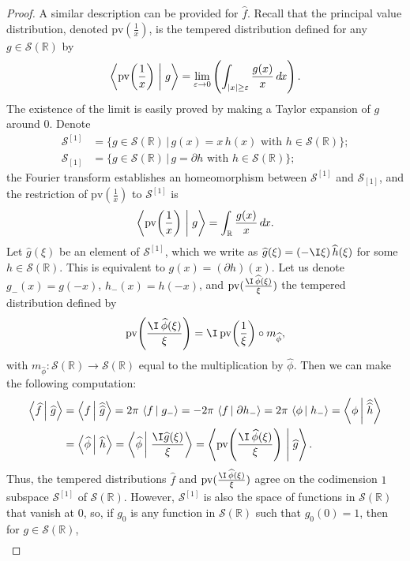 \documentclass[envcountsame]{svmult}
\newcommand{\R}{\mathbb{R}}
\newcommand{\schwartz}{\mathscr{S}}
\newcommand{\eps}{\varepsilon}
\newcommand{\scal}[2]{\left\langle #1\vphantom{#2}\,\right |\left.#2 \vphantom{#1}\right\rangle}
\newcommand{\DD}[1]{\,d\hspace*{-0.3mm}{#1}}
\begin{document}
\begin{proof}
A similar description can be provided for $\widehat{f}$. Recall that the principal value distribution, denoted $\mathrm{pv}(\frac{1}{x})$, is the tempered distribution defined for any $g \in \schwartz(\R)$ by
$$\scal{\mathrm{pv}\!\left(\frac{1}{x}\right)}{g} = \lim_{\eps \to 0} \left(\int_{|x|\geq \eps} \frac{g(x)}{x}\DD{x}\right).$$
The existence of the limit is easily proved by making a Taylor expansion of $g$ around $0$. 
Denote 
\begin{align*}
\schwartz^{[1]} &= \{g \in \schwartz(\R)\,|\,g(x) = x\,h(x) \text{ with }h \in \schwartz(\R)\} ;\\
\schwartz_{[1]} &= \{g \in \schwartz(\R)\,|\,g = \partial h \text{ with }h \in \schwartz(\R)\} ;
\end{align*}
the Fourier transform establishes an homeomorphism between $\schwartz^{[1]}$ and $\schwartz_{[1]}$, and the restriction of $\mathrm{pv}(\frac{1}{x})$ to $\schwartz^{[1]}$ is
$$\scal{\mathrm{pv}\!\left(\frac{1}{x}\right)}{g} = \int_{\R} \frac{g(x)}{x}\DD{x}.$$
Let $\widehat{g}(\xi)$ be an element of $\schwartz^{[1]}$, which we write as $\widehat{g}(\xi) = (-\I\xi)\,\widehat{h}(\xi)$ for some $h \in \schwartz(\R)$. This is equivalent to $g(x) = (\partial h)(x)$.
Let us denote $g_-(x) = g(-x)$, $h_-(x) = h(-x)$,
and $\mathrm{pv}(\frac{\I\,\widehat{\phi}(\xi)}{\xi})$ the tempered distribution defined by 
$$\mathrm{pv}\!\left(\frac{\I\,\widehat{\phi}(\xi)}{\xi}\right) = \I\, \mathrm{pv}\!\left(\frac{1}{\xi}\right)\circ m_{\widehat{\phi}},$$
with $m_{\widehat{\phi}}:\schwartz(\R) \to \schwartz(\R)$ equal to the multiplication by $\widehat{\phi}$.
Then we can make the following computation:
\begin{align*}
\scal{\widehat{f}}{\widehat{g}} &= \scal{f}{\widehat{\widehat{g}}} = 2\pi\,\scal{f}{g_-} = - 2\pi\, \scal{f}{\partial h_-} = 2\pi\, \scal{\phi}{h_-} = \scal{\phi}{\widehat{\widehat{h}}}\\
&= \scal{\widehat{\phi}}{\widehat{h}} = \scal{\widehat{\phi}}{\frac{\I \widehat{g}(\xi)}{\xi}} = \scal{\mathrm{pv}\!\left(\frac{\I\,\widehat{\phi}(\xi)}{\xi}\right)}{\widehat{g}}.
\end{align*}
Thus, the tempered distributions $\widehat{f}$ and $\mathrm{pv}(\frac{\I\,\widehat{\phi}(\xi)}{\xi})$ agree on the codimension $1$ subspace $\schwartz^{[1]}$ of $\schwartz(\R)$. However, $\schwartz^{[1]}$ is also the space of functions in $\schwartz(\R)$ that vanish at $0$, so, if $g_0$ is any function in $\schwartz(\R)$ such that $g_0(0)=1$, then for $g \in \schwartz(\R)$,
\begin{align*}

\end{align*}
\end{proof}
\end{document}
